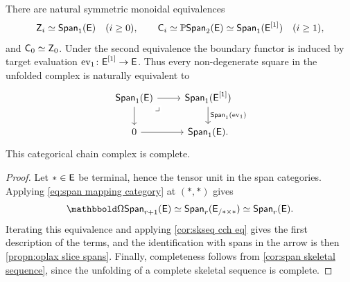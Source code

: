 \documentclass[a4paper,11pt]{article}
\begin{document}
\begin{cor}\label{propn:span chain complex}
  There are natural symmetric monoidal equivalences
  \[
    \textup{\textsf{Z}}_i\simeq\textup{\textsf{Span}}_1(\textup{\textsf{E}})\quad(i\geq0),
    \qquad
    \textup{\textsf{C}}_i \simeq \mathbb{P}\textup{\textsf{Span}}_{2}(\textup{\textsf{E}}) \simeq \textup{\textsf{Span}}_1(\textup{\textsf{E}}^{[1]})\quad(i\geq1),
  \]
  and $\textup{\textsf{C}}_0\simeq\textup{\textsf{Z}}_0$.  Under the second equivalence the boundary
  functor is induced by target evaluation
  $\ev_1\colon\oE^{[1]}\to\oE$.  Thus every non-degenerate
  square in the unfolded complex is naturally equivalent to
  \[
    \begin{tikzcd}
      \Span_1(\oE) \drpullback \ar[r] \ar[d]
        & \Span_1(\oE^{[1]})
          \ar[d,"\Span_1(\ev_1)"] \\
      0 \ar[r] & \Span_1(\oE).
    \end{tikzcd}
  \]
  This categorical chain complex is complete.
\end{cor}

\begin{proof}
  Let $*\in\textup{\textsf{E}}$ be terminal, hence the tensor unit in the span
  categories.  Applying \cref{eq:span mapping category} at $(*,*)$
  gives
  \[
    \mOm\Span_{r+1}(\oE)
      \simeq\Span_r(\oE_{/*\times *})
      \simeq\Span_r(\oE).
  \]
  Iterating this equivalence and applying
  \cref{cor:skseq cch eq} gives the first description of the terms, and the identification with spans in the arrow \icat{} is then \cref{propn:oplax slice spans}.
  Finally, completeness follows from
  \cref{cor:span skeletal sequence}, since the unfolding of a complete
  skeletal sequence is complete.
\end{proof}
\end{document}
